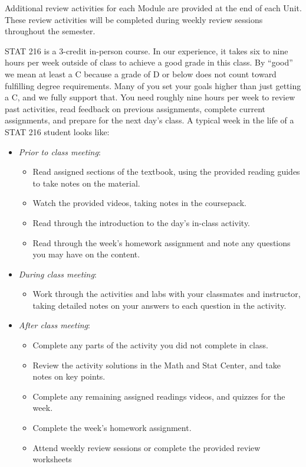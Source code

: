 \documentclass[
]{report}
\providecommand{\tightlist}{%
  \setlength{\itemsep}{0pt}\setlength{\parskip}{0pt}}
\begin{document}
Additional review activities for each Module are provided at the end of each Unit. These review activities will be completed during weekly review sessions throughout the semester.

STAT 216 is a 3-credit in-person course. In our experience, it takes six to nine hours per week outside of class to achieve a good grade in this class. By ``good'' we mean at least a C because a grade of D or below does not count toward fulfilling degree requirements. Many of you set your goals higher than just getting a C, and we fully support that. You need roughly nine hours per week to review past activities, read feedback on previous assignments, complete current assignments, and prepare for the next day's class. A typical week in the life of a STAT 216 student looks like:

\begin{itemize}
\tightlist
\item
  \emph{Prior to class meeting}:

  \begin{itemize}
  \tightlist
  \item
    Read assigned sections of the textbook, using the provided reading guides to take notes on the material.
  \item
    Watch the provided videos, taking notes in the coursepack.
  \item
    Read through the introduction to the day's in-class activity.
  \item
    Read through the week's homework assignment and note any questions you may have on the content.
  \end{itemize}
\item
  \emph{During class meeting}:

  \begin{itemize}
  \tightlist
  \item
    Work through the activities and labs with your classmates and instructor, taking detailed notes on your answers to each question in the activity.
  \end{itemize}
\item
  \emph{After class meeting}:

  \begin{itemize}
  \tightlist
  \item
    Complete any parts of the activity you did not complete in class.
  \item
    Review the activity solutions in the Math and Stat Center, and take notes on key points.
  \item
    Complete any remaining assigned readings videos, and quizzes for the week.
  \item
    Complete the week's homework assignment.
  \item
    Attend weekly review sessions or complete the provided review worksheets
  \end{itemize}
\end{itemize}
\end{document}

